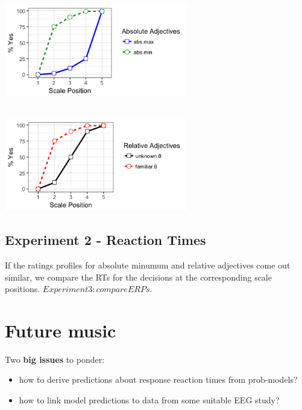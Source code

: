 \documentclass[fleqn,reqno,10pt]{article}
\begin{document}
\begin{multicols}{2}

\\
\includegraphics[width=8cm]{images/hypothetical_absolute.png}\\
\\
\columnbreak

\includegraphics[width=8cm]{images/hypothetical_relative.png}
\end{multicols}

\subsection{Experiment 2 - Reaction Times}
If the ratings profiles for absolute minumum and relative adjectives come out similar, we compare the RTs for the decisions at the corresponding scale positions. \Rightarrow$ Experiment 3: compare ERPs.$


\section{Future music}

Two \textbf{big issues} to ponder:

\begin{itemize}
\item how to derive predictions about response reaction times from prob-models?
\item how to link model predictions to data from some suitable EEG study?
\end{itemize}
\end{document}
